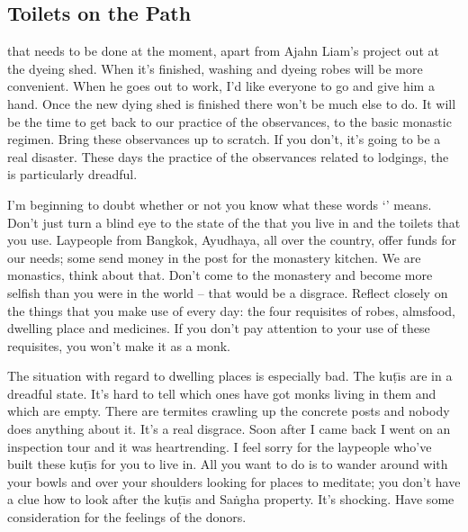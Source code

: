 \vspace*{\baselineskip}

\subsection{Toilets on the Path}

 that needs to be done at the moment, apart from Ajahn Liam's project out at the dyeing shed. When it's finished, washing and dyeing robes will be more convenient. When he goes out to work, I'd like everyone to go and give him a hand. Once the new dying shed is finished there won't be much else to do. It will be the time to get back to our practice of the observances, to the basic monastic regimen. Bring these observances up to scratch. If you don't, it's going to be a real disaster. These days the practice of the observances related to lodgings, the  is particularly dreadful.

I'm beginning to doubt whether or not you know what these words `' means. Don't just turn a blind eye to the state of the  that you live in and the toilets that you use. Laypeople from Bangkok, Ayudhaya, all over the country, offer funds for our needs; some send money in the post for the monastery kitchen. We are monastics, think about that. Don't come to the monastery and become more selfish than you were in the world -- that would be a disgrace. Reflect closely on the things that you make use of every day: the four requisites of robes, almsfood, dwelling place and medicines. If you don't pay attention to your use of these requisites, you won't make it as a monk.

The situation with regard to dwelling places is especially bad. The ku\d{t}\={\i}s are in a dreadful state. It's hard to tell which ones have got monks living in them and which are empty. There are termites crawling up the concrete posts and nobody does anything about it. It's a real disgrace. Soon after I came back I went on an inspection tour and it was heartrending. I feel sorry for the laypeople who've built these ku\d{t}\={\i}s for you to live in. All you want to do is to wander around with your bowls and  over your shoulders looking for places to meditate; you don't have a clue how to look after the ku\d{t}\={\i}s and Sa\.ngha property. It's shocking. Have some consideration for the feelings of the donors.

